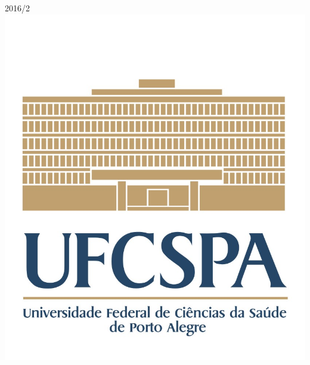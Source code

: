 \begin{titlepage}

{\large 2016/2}\\[2cm] %


\includegraphics[scale=0.5]{logo.jpg}\\[1cm] %
 

\vfill %

\end{titlepage}


